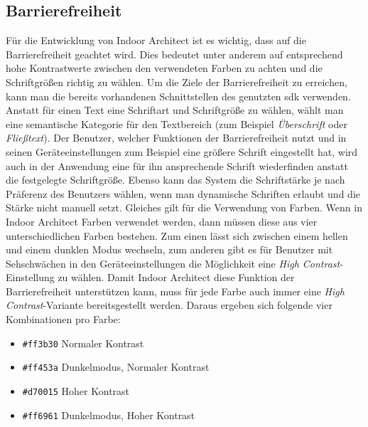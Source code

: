 \subsection{Barrierefreiheit}
Für die Entwicklung von Indoor Architect ist es wichtig, dass auf die Barrierefreiheit geachtet wird.
Dies bedeutet unter anderem auf entsprechend hohe Kontrastwerte zwischen den verwendeten Farben zu achten und die Schriftgrößen richtig zu wählen.
Um die Ziele der Barrierefreiheit zu erreichen, kann man die bereits vorhandenen Schnittstellen des genutzten \Gls{sdk} verwenden.\pbreak%
%
Anstatt für einen Text eine Schriftart und Schriftgröße zu wählen, wählt man eine semantische Kategorie für den Textbereich (zum Beispiel \emph{Überschrift} oder \emph{Fließtext}).
Der Benutzer, welcher Funktionen der Barrierefreiheit nutzt und in seinen Geräteeinstellungen zum Beispiel eine größere Schrift eingestellt hat, wird auch in der Anwendung eine für ihn ansprechende Schrift wiederfinden anstatt die festgelegte Schriftgröße.
Ebenso kann das System die Schriftstärke je nach Präferenz des Benutzers wählen, wenn man dynamische Schriften erlaubt und die Stärke nicht manuell setzt.\pbreak%
%
Gleiches gilt für die Verwendung von Farben.
Wenn in Indoor Architect Farben verwendet werden, dann müssen diese aus vier unterschiedlichen Farben bestehen.
Zum einen lässt sich zwischen einem hellen und einem dunklen Modus wechseln, zum anderen gibt es für Benutzer mit Sehschwächen in den Geräteeinstellungen die Möglichkeit eine \emph{High Contrast}-Einstellung zu wählen.
Damit Indoor Architect diese Funktion der Barrierefreiheit unterstützen kann, muss für jede Farbe auch immer eine \emph{High Contrast}-Variante bereitsgestellt werden.
Daraus ergeben sich folgende vier Kombinationen pro Farbe:
\begin{itemize}
	\setlength\itemsep{0pt}
	\item[] \colorbox{redL}{\color{white}\texttt{\#ff3b30}\hspace{20pt}} \hspace{10pt}Normaler Kontrast
	\item[] \colorbox{redDL}{\color{white}\texttt{\#ff453a}\hspace{20pt}} \hspace{10pt}Dunkelmodus, Normaler Kontrast
	\item[] \colorbox{redH}{\color{white}\texttt{\#d70015}\hspace{20pt}} \hspace{10pt}Hoher Kontrast
	\item[] \colorbox{redDH}{\color{white}\texttt{\#ff6961}\hspace{20pt}} \hspace{10pt}Dunkelmodus, Hoher Kontrast
\end{itemize}
